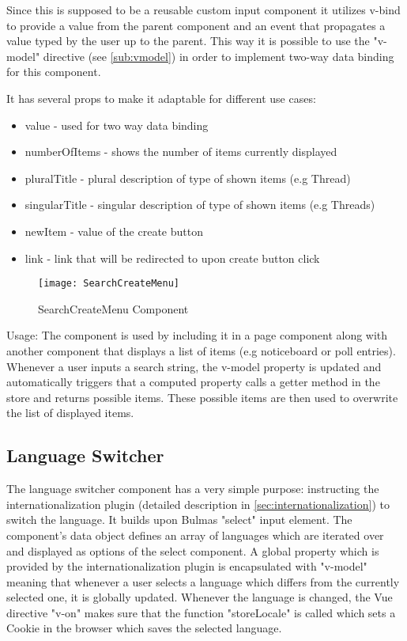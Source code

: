 Since this is supposed to be a reusable custom input component it utilizes v-bind to provide a value from the parent component and an event that propagates a value typed by the user up to the parent. This way it is possible to use the "v-model" directive (see \autoref{sub:vmodel}) in order to implement two-way data binding for this component. 

It has several props to make it adaptable for different use cases:

\begin{itemize}
  \item value - used for two way data binding
  \item numberOfItems - shows the number of items currently displayed
  \item pluralTitle - plural description of type of shown items (e.g Thread)
  \item singularTitle - singular description of type of shown items (e.g Threads)
  \item newItem - value of the create button
  \item link - link that will be redirected to upon create button click
\end{itemize}

\begin{figure}[H]
  \begin{center}
  \texttt{[image: SearchCreateMenu]}
  \end{center}
  \caption{SearchCreateMenu Component}
  \label{fig:searchcreate}
\end{figure}

Usage: The component is used by including it in a page component along with another component that displays a list of items (e.g noticeboard or poll entries). Whenever a user inputs a search string, the v-model property is updated and automatically triggers that a computed property calls a getter method in the store and returns possible items. These possible items are then used to overwrite the list of displayed items.

\subsection{Language Switcher} \label{langswitcher}
The language switcher component has a very simple purpose: instructing the internationalization plugin (detailed description in \autoref{sec:internationalization}) to switch the language. It builds upon Bulmas "select" input element. The component's data object defines an array of languages which are iterated over and displayed as options of the select component. A global property which is provided by the internationalization plugin is encapsulated with "v-model" meaning that whenever a user selects a language which differs from the currently selected one, it is globally updated. Whenever the language is changed, the Vue directive "v-on" makes sure that the function "storeLocale" is called which sets a Cookie in the browser which saves the selected language.

